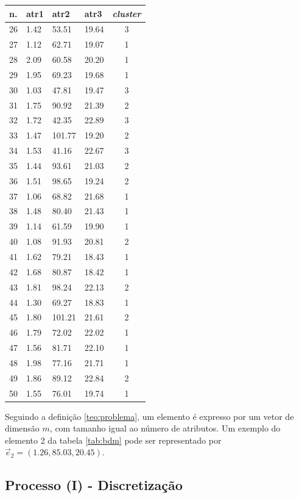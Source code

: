 \begin{table}[!ht]
\begin{tabular}{ |l|l|l|l|c| }
\hline
n.  & atr1 & atr2 & atr3 & \textit{cluster} \\ \hline
26 & 1.42 & 53.51 & 19.64 & 3 \\ \hline
27 & 1.12 & 62.71 & 19.07 & 1 \\ \hline
28 & 2.09 & 60.58 & 20.20 & 1 \\ \hline
29 & 1.95 & 69.23 & 19.68 & 1 \\ \hline
30 & 1.03 & 47.81 & 19.47 & 3 \\ \hline
31 & 1.75 & 90.92 & 21.39 & 2 \\ \hline
32 & 1.72 & 42.35 & 22.89 & 3 \\ \hline
33 & 1.47 & 101.77 & 19.20 & 2 \\ \hline
34 & 1.53 & 41.16 & 22.67 & 3 \\ \hline
35 & 1.44 & 93.61 & 21.03 & 2 \\ \hline
36 & 1.51 & 98.65 & 19.24 & 2 \\ \hline
37 & 1.06 & 68.82 & 21.68 & 1 \\ \hline
38 & 1.48 & 80.40 & 21.43 & 1 \\ \hline
39 & 1.14 & 61.59 & 19.90 & 1 \\ \hline
40 & 1.08 & 91.93 & 20.81 & 2 \\ \hline
41 & 1.62 & 79.21 & 18.43 & 1 \\ \hline
42 & 1.68 & 80.87 & 18.42 & 1 \\ \hline
43 & 1.81 & 98.24 & 22.13 & 2 \\ \hline
44 & 1.30 & 69.27 & 18.83 & 1 \\ \hline
45 & 1.80 & 101.21 & 21.61 & 2 \\ \hline
46 & 1.79 & 72.02 & 22.02 & 1 \\ \hline
47 & 1.56 & 81.71 & 22.10 & 1 \\ \hline
48 & 1.98 & 77.16 & 21.71 & 1 \\ \hline
49 & 1.86 & 89.12 & 22.84 & 2 \\ \hline
50 & 1.55 & 76.01 & 19.74 & 1 \\ \hline
\end{tabular}
\end{table}

Seguindo a definição \ref{teo:problema}, um elemento é expresso por um vetor  de dimensão ${m}$, com tamanho igual ao número de atributos. Um exemplo do elemento 2 da tabela \ref{tab:bdm} pode ser representado por ${\vec{e}_{2}=(1.26,85.03, 20.45)}$.

\subsection{Processo (I) - Discretização} \label{cap:ferramentas:ssec:disc}


